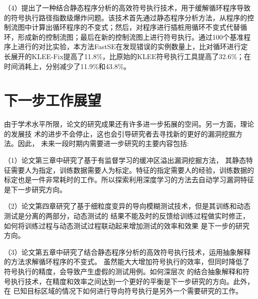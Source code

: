 （4）提出了一种结合静态程序分析的高效符号执行技术，用于缓解循环程序导致的符号执行路径指数级爆炸问题。该技术首先通过静态程序分析方法，从程序的控制流图中计算出循环程序的不变式；然后，对程序进行插桩用循环不变式代替循环，形成新的控制流图；最后在新的控制流图上进行符号执行。通过100个基准程序上进行的对比实验，本方法FastSE在发现错误的实例数量上，比对循环进行定长展开的KLEE-Fix提高了11.8\%，比原始的KLEE符号执行工具提高了32.6\%；在时间消耗上，分别减少了11.9\%和43.8\%。


\section{下一步工作展望}
由于学术水平所限，论文的研究成果还有许多进一步拓展的空间。另一方面，理论的发展技
术的进步不会停止，这也会引导研究者去寻找新的更好的漏洞挖掘方法。因此，
未来一段时期内需要进一步研究的主要内容包括:

（1）论文第三章中研究了基于有监督学习的缓冲区溢出漏洞挖掘方法，
其静态特征需要人为指定，训练数据需要人为标定。特征的指定需要人的经验，训练数据的
标定也是一件非常耗时的工作。所以探索利用深度学习的方法去自动学习漏洞特征是下一步研究方向。

（2）论文第四章研究了基于细粒度变异的导向模糊测试技术，但是其训练和动态测试是分离的两部分，动态测试的
结果不能及时的反馈给训练过程做实时修正，如何将训练过程与动态测试过程联动起来增加测试的效率和效果
是下一步的研究方向。

（3）论文第五章中研究了结合静态程序分析的高效符号执行技术，运用抽象解释的方法求解循环程序的不变式。
虽然能大大增加符号执行的效率，但同时降低了符号执行的精度，会导致产生虚假的测试用例。如何深层次
的结合抽象解释和符号执行技术，在精度和效率之间达到一个更好的平衡是下一步研究的方向。此外，在
已知目标区域的情况下如何进行导向符号执行是另外一个需要研究的工作。
